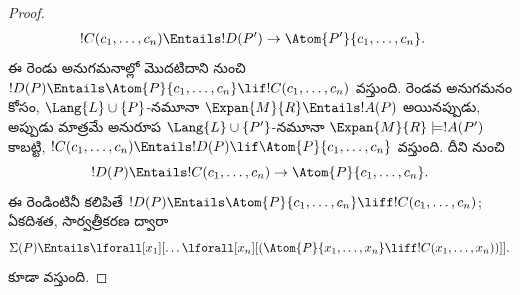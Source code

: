 \documentclass[../../../include/open-logic-section]{subfiles}
\begin{document}
\begin{proof}
\begin{align*}
  !C(c_1,\dots, c_n) & \Entails !D(P') \to \Atom{P'}{c_1, \dots, c_n}.
\end{align*}
ఈ రెండు అనుగమనాల్లో మొదటిదాని నుంచి $!D(P) \Entails
\Atom{P}{c_1,\dots, c_n} \lif !C(c_1,\dots, c_n)$ వస్తుంది.
రెండవ అనుగమనం కోసం, $\Lang{L} \cup \{P\}$-నమూనా
$\Expan{M}{R} \Entails !A(P)$ అయినప్పుడు, అప్పుడు మాత్రమే అనురూప
$\Lang{L} \cup \{P'\}$-నమూనా $\Expan{M}{R} \models !A(P')$ కాబట్టి,
$!C(c_1,\dots, c_n) \Entails !D(P) \lif
\Atom{P}{c_1,\dots, c_n}$ వస్తుంది. దీని నుంచి
\[
!D(P) \Entails !C(c_1,\dots,c_n) \to \Atom{P}{c_1,\dots, c_n}.
\]
ఈ రెండింటినీ కలిపితే $!D(P) \Entails \Atom{P}{c_1,\dots, c_n}
\liff !C(c_1, \dots, c_n)$; ఏకదిశత, సార్వత్రీకరణ ద్వారా
\[
\Sigma(P) \Entails
\lforall[x_1][\dots\lforall[x_n][(\Atom{P}{x_1,\dots, x_n} \liff
    !C(x_1,\dots, x_n))]].
\]
కూడా వస్తుంది.
\end{proof}
\end{document}
